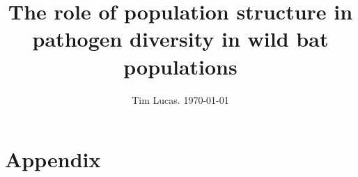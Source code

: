 \documentclass[a4paper,10pt,reqno]{amsart}
\begin{document}
\title{The role of population structure in pathogen diversity in wild bat populations}
\author{Tim Lucas. \today}
\date{}

\maketitle
\tableofcontents






\section{Appendix}



\small
\end{document}
